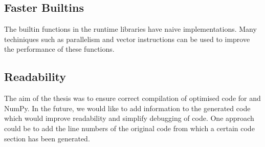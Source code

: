 \subsection{Faster Builtins}
The builtin functions in the runtime libraries have naive implementations. Many techiniques such as parallelism and vector instructions can be used to improve the performance of these functions. 
\subsection{Readability}
The aim of the thesis was to ensure correct compilation of optimised code for \matlab and NumPy. In the future, we would like to add information to the generated code which would improve readability and simplify debugging of code. One approach could be to add the line numbers of the original code from which a certain code section has been generated. 
